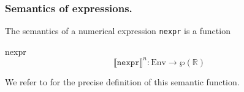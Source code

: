 \documentclass[a4paper,11pt]{article}
\newcommand{\sem}[1]{\llbracket #1 \rrbracket}
\begin{document}
\subsubsection{Semantics of expressions.}

The semantics of a numerical expression \texttt{nexpr}
is a function
\htmlonly{\begin{quote}}\begin{image}{nexpr}
  $$
  \sem{\texttt{nexpr}}^n : \mathrm{Env} \rightarrow \wp(\mathbb{R})
  $$
 \end{image}\htmlonly{\end{quote}}
We refer to \cite{mine04} for the precise definition of this semantic
function.
\end{document}
